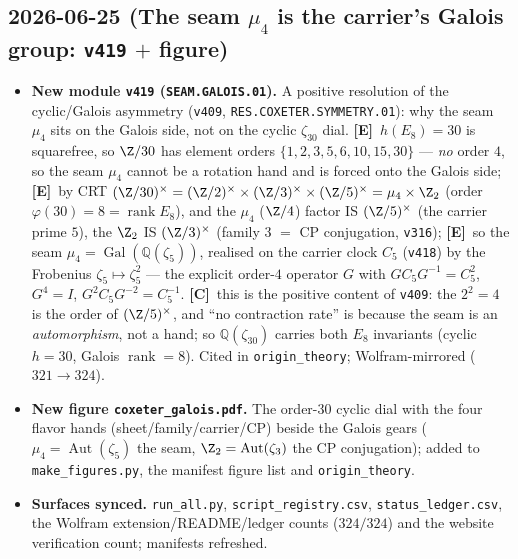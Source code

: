 \documentclass[11pt]{article}
\providecommand{\mE}{\textbf{[E]}}\providecommand{\mC}{\textbf{[C]}}
\providecommand{\vref}[1]{\texttt{#1}}
\begin{document}
\subsection*{2026-06-25 (The seam $\mu_4$ is the carrier's Galois group: \texttt{v419} $+$ figure)}
\begin{itemize}
\item \textbf{New module \texttt{v419} (\texttt{SEAM.GALOIS.01}).} A positive resolution of the
cyclic/Galois asymmetry (\vref{v409}, \texttt{RES.COXETER.SYMMETRY.01}): why the seam $\mu_4$ sits on the
Galois side, not on the cyclic $\zeta_{30}$ dial. \mE\ $h(E_8)=30$ is squarefree, so $\Z/30$ has element
orders $\{1,2,3,5,6,10,15,30\}$ --- \emph{no} order $4$, so the seam $\mu_4$ cannot be a rotation hand and
is forced onto the Galois side; \mE\ by CRT $(\Z/30)^\times=(\Z/2)^\times\times(\Z/3)^\times\times(\Z/5)^\times
=\mu_4\times\Z_2$ (order $\varphi(30)=8=\operatorname{rank}E_8$), and the $\mu_4$ ($\Z/4$) factor IS
$(\Z/5)^\times$ (the
carrier prime $5$), the $\Z_2$ IS $(\Z/3)^\times$ (family $3$ $=$ CP conjugation, \vref{v316}); \mE\ so the
seam $\mu_4=\operatorname{Gal}(\mathbb Q(\zeta_5))$, realised on the carrier clock $C_5$ (\vref{v418}) by the
Frobenius $\zeta_5\mapsto\zeta_5^2$ --- the explicit order-$4$ operator $G$ with $GC_5G^{-1}=C_5^2$, $G^4=I$,
$G^2C_5G^{-2}=C_5^{-1}$. \mC\ this is the positive content of \vref{v409}: the $2^2{=}4$ is the order of
$(\Z/5)^\times$, and ``no contraction rate'' is because the seam is an \emph{automorphism}, not a hand; so
$\mathbb Q(\zeta_{30})$ carries both $E_8$ invariants (cyclic $h{=}30$, Galois $\operatorname{rank}{=}8$).
Cited in \texttt{origin\_theory}; Wolfram-mirrored ($321\to324$).
\item \textbf{New figure \texttt{coxeter\_galois.pdf}.} The order-$30$ cyclic dial with the four flavor
hands (sheet/family/carrier/CP) beside the Galois gears ($\mu_4=\operatorname{Aut}(\zeta_5)$ the seam,
$\Z_2=\operatorname{Aut}(\zeta_3)$ the CP conjugation); added to \texttt{make\_figures.py}, the manifest
figure list and \texttt{origin\_theory}.
\item \textbf{Surfaces synced.} \texttt{run\_all.py}, \texttt{script\_registry.csv},
\texttt{status\_ledger.csv}, the Wolfram extension/README/ledger counts ($324/324$) and the website
verification count; manifests refreshed.
\end{itemize}
\end{document}
